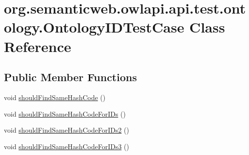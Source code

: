 \hypertarget{classorg_1_1semanticweb_1_1owlapi_1_1api_1_1test_1_1ontology_1_1_ontology_i_d_test_case}{\section{org.\-semanticweb.\-owlapi.\-api.\-test.\-ontology.\-Ontology\-I\-D\-Test\-Case Class Reference}
\label{classorg_1_1semanticweb_1_1owlapi_1_1api_1_1test_1_1ontology_1_1_ontology_i_d_test_case}
}
\subsection*{Public Member Functions}
\begin{DoxyCompactItemize}
\item 
void \hyperlink{classorg_1_1semanticweb_1_1owlapi_1_1api_1_1test_1_1ontology_1_1_ontology_i_d_test_case_a75133d161d1361933845b7ce28b81476}{should\-Find\-Same\-Hash\-Code} ()
\item 
void \hyperlink{classorg_1_1semanticweb_1_1owlapi_1_1api_1_1test_1_1ontology_1_1_ontology_i_d_test_case_a6ea3ef104e8c451c0c898b7968be1bf9}{should\-Find\-Same\-Hash\-Code\-For\-I\-Ds} ()
\item 
void \hyperlink{classorg_1_1semanticweb_1_1owlapi_1_1api_1_1test_1_1ontology_1_1_ontology_i_d_test_case_abf7100c6e233138148f3712cf2ebbe1a}{should\-Find\-Same\-Hash\-Code\-For\-I\-Ds2} ()
\item 
void \hyperlink{classorg_1_1semanticweb_1_1owlapi_1_1api_1_1test_1_1ontology_1_1_ontology_i_d_test_case_a1da521ee1728d8ef342ca62843001049}{should\-Find\-Same\-Hash\-Code\-For\-I\-Ds3} ()
\end{DoxyCompactItemize}


